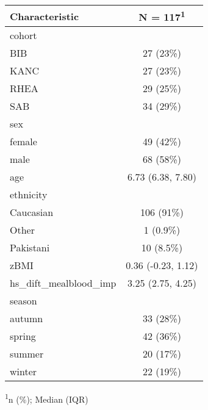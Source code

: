 \captionsetup[table]{labelformat=empty,skip=1pt}
\begin{longtable}{lc}
\toprule
\textbf{Characteristic} & \textbf{N = 117}\textsuperscript{1} \\ 
\midrule
cohort &  \\ 
BIB & 27 (23\%) \\ 
KANC & 27 (23\%) \\ 
RHEA & 29 (25\%) \\ 
SAB & 34 (29\%) \\ 
sex &  \\ 
female & 49 (42\%) \\ 
male & 68 (58\%) \\ 
age & 6.73 (6.38, 7.80) \\ 
ethnicity &  \\ 
Caucasian & 106 (91\%) \\ 
Other & 1 (0.9\%) \\ 
Pakistani & 10 (8.5\%) \\ 
zBMI & 0.36 (-0.23, 1.12) \\ 
hs\_dift\_mealblood\_imp & 3.25 (2.75, 4.25) \\ 
season &  \\ 
autumn & 33 (28\%) \\ 
spring & 42 (36\%) \\ 
summer & 20 (17\%) \\ 
winter & 22 (19\%) \\ 
 \bottomrule
\end{longtable}
\vspace{-5mm}
\begin{minipage}{\linewidth}
\textsuperscript{1}n (\%); Median (IQR) \\ 
\end{minipage}

